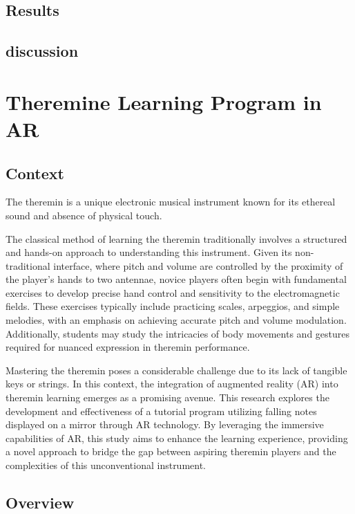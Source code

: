 \subsection{Results}

\subsection{discussion}

\section{Theremine Learning Program in AR}

\subsection{Context}

The theremin is a unique electronic musical instrument known for its ethereal sound and absence of physical touch. 

The classical method of learning the theremin traditionally involves a structured and hands-on approach to understanding this instrument. Given its non-traditional interface, where pitch and volume are controlled by the proximity of the player's hands to two antennae, novice players often begin with fundamental exercises to develop precise hand control and sensitivity to the electromagnetic fields. These exercises typically include practicing scales, arpeggios, and simple melodies, with an emphasis on achieving accurate pitch and volume modulation. Additionally, students may study the intricacies of body movements and gestures required for nuanced expression in theremin performance. 

Mastering the theremin poses a considerable challenge due to its lack of tangible keys or strings. In this context, the integration of augmented reality (AR) into theremin learning emerges as a promising avenue. This research explores the development and effectiveness of a tutorial program utilizing falling notes displayed on a mirror through AR technology. By leveraging the immersive capabilities of AR, this study aims to enhance the learning experience, providing a novel approach to bridge the gap between aspiring theremin players and the complexities of this unconventional instrument.

\subsection{Overview}

